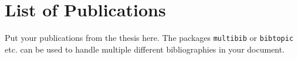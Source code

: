 
\chapter*{List of Publications}

Put your publications from the thesis here. The packages \texttt{multibib} or \texttt{bibtopic} etc. can be used to handle multiple different bibliographies in your document.
